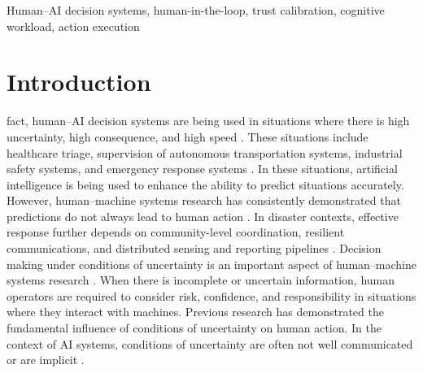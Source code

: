 \documentclass[journal]{IEEEtran}
\theoremstyle{plain}
\theoremstyle{definition}
\begin{document}
    \begin{IEEEkeywords}
        Human--AI decision systems, human-in-the-loop, trust calibration, cognitive workload, action execution
    \end{IEEEkeywords}

\section{Introduction}
 fact, human--AI decision systems are being used in situations where there is high uncertainty, high consequence, and high speed \cite{Bach2024Access,PerezCerrolaza2024CSUR,Yang2022THMSReview}. These situations include healthcare triage, supervision of autonomous transportation systems, industrial safety systems, and emergency response systems \cite{Birkmann2013NatHazards,Sandoval2023IJDRS,Rokhideh2025IJDRS,Rao2024IJDRS,Charan2024,lim2026generativeaidrivenreliabilitylayer}. In these situations, artificial intelligence is being used to enhance the ability to predict situations accurately. However, human--machine systems research has consistently demonstrated that predictions do not always lead to human action \cite{Lai2023FAccT,Muller2022CHIWORK,Hodgson2013THMS}. In disaster contexts, effective response further depends on community-level coordination, resilient communications, and distributed sensing and reporting pipelines \cite{Stephens2022SIGDOC,Longo2025PMC,Yang2005MobiHoc}.
Decision making under conditions of uncertainty is an important aspect of human--machine systems research \cite{Yang2022THMSReview,Bach2024Access,lim2026generativeaidrivenreliabilitylayer}. When there is incomplete or uncertain information, human operators are required to consider risk, confidence, and responsibility in situations where they interact with machines. Previous research has demonstrated the fundamental influence of conditions of uncertainty on human action. In the context of AI systems, conditions of uncertainty are often not well communicated or are implicit \cite{McAllister2017IJCAI,Weidinger2022FAccT,Miller2019XRDS}.
\end{document}
